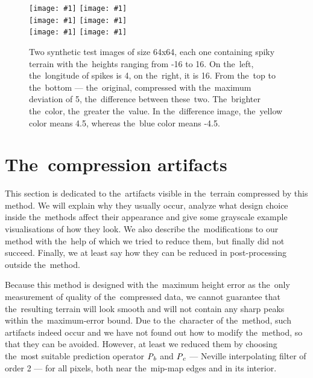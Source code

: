 \newcommand{\incexamplpair}[1]{\texttt{[image: \#1]}}

\begin{figure}
	\begin{center}
	\incexamplpair{figures/dim_64_amp_16_lon_4_horizontal_orig.png} 
	\incexamplpair{figures/dim_64_amp_16_lon_16_horizontal_orig.png} \\ 
	\incexamplpair{figures/dim_64_amp_16_lon_4_horizontal_out.png} 
	\incexamplpair{figures/dim_64_amp_16_lon_16_horizontal_out.png} \\ 
	\incexamplpair{figures/dim_64_amp_16_lon_4_horizontal_diff.png} 
	\incexamplpair{figures/dim_64_amp_16_lon_16_horizontal_diff.png}
    \end{center}
	\caption{Two synthetic test images of size 64x64, each one containing spiky terrain with the~heights ranging from -16 to 16. On the~left, the~longitude of spikes is 4, on the~right, it is 16. From the~top to the~bottom --- the~original, compressed with the~maximum deviation of 5, the~difference between these~two. The~brighter the~color, the~greater the~value. In the~difference image, the~yellow color means 4.5, whereas the~blue color means -4.5.}
	\label{fig:result_wave_samples}
\end{figure}

\section{The~compression artifacts}\label{sec:artifs}

This section is dedicated to the~artifacts visible in the~terrain compressed by this method. We will explain why they usually occur, analyze what design choice inside the~methods affect their appearance and give some grayscale example visualisations of how they look. We also describe the~modifications to our method with the~help of which we tried to reduce them, but finally did not succeed. Finally, we at least say how they can be reduced in post-processing outside the~method.

Because this method is designed with the~maximum height error as the~only measurement of quality of the~compressed data, we cannot guarantee that the~resulting terrain will look smooth and will not contain any sharp peaks within the~maximum-error bound. Due to the~character of the~method, such artifacts indeed occur and we have not found out how to modify the~method, so that they can be avoided. However, at least we reduced them by choosing the~most suitable prediction operator $\mathit{P_{b}}$ and $\mathit{P_{c}}$ --- Neville interpolating filter of order 2 --- for all pixels, both near the~mip-map edges and in its interior.

